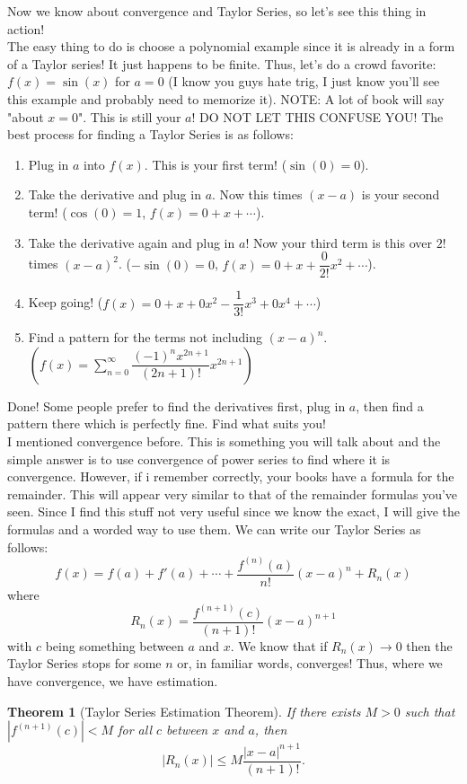 \documentclass[10pt]{article}
\theoremstyle{Theorem}
\newtheorem{theorem}{Theorem}[section]
\theoremstyle{definition}
\theoremstyle{remark}
\theoremstyle{custom}
\begin{document}
Now we know about convergence and Taylor Series, so let's see this thing in action!\\
The easy thing to do is choose a polynomial example since it is already in a form of a Taylor series! It just happens to be finite. Thus, let's do a crowd favorite: $f(x)=\sin(x)$ for $a=0$ (I know you guys hate trig, I just know you'll see this example and probably need to memorize it).
NOTE: A lot of book will say "about $x=0$". This is still your $a$! DO NOT LET THIS CONFUSE YOU! The best process for finding a Taylor Series is as follows:
\begin{enumerate}[1.]
\item Plug in $a$ into $f(x)$. This is your first term! ($\sin(0)=0$). 
\item Take the derivative and plug in $a$.  Now this times $(x-a)$ is your second term! ($\cos(0)=1$, $f(x)=0+x+ \cdots$).
\item Take the derivative again and plug in $a$! Now your third term is this over $2!$ times $(x-a)^2$. ($-\sin(0)=0$, $f(x)=0+x+\dfrac{0}{2!}x^2+\cdots$).
\item Keep going! ($f(x)=0+x+0x^2-\dfrac{1}{3!}x^3+0x^4+\cdots$)
\item Find a pattern for the terms not including $(x-a)^n$. $\left(f(x)=\sum_{n=0}^{\infty}\dfrac{(-1)^{n}x^{2n+1}}{(2n+1)!}x^{2n+1}\right)$
\end{enumerate}
Done! Some people prefer to find the derivatives first, plug in $a$, then find a pattern there which is perfectly fine. Find what suits you!\\ 
I mentioned convergence before. This is something you will talk about and the simple answer is to use convergence of power series to find where it is convergence. However, if i remember correctly, your books have a formula for the remainder. This will appear very similar to that of the remainder formulas you've seen. Since I find this stuff not very useful since we know the exact, I will give the formulas and a worded way to use them.
\newpage
We can write our Taylor Series as follows:
\[
f(x)=f(a)+f'(a)+\cdots +\dfrac{f^{(n)}(a)}{n!}(x-a)^n+R_n(x)
\]
where
\[
R_n(x)=\dfrac{f^{(n+1)}(c)}{(n+1)!}(x-a)^{n+1}
\] 
with $c$ being something between $a$ and $x$. We know that if $R_n(x) \rightarrow 0$ then the Taylor Series stops for some $n$ or, in familiar words, converges! Thus, where we have convergence, we have estimation.
\begin{theorem}[Taylor Series Estimation Theorem]
If there exists $M>0$ such that $|f^{(n+1)}(c)|<M$ for all $c$ between $x$ and $a$, then 
\[
|R_n(x)|\leq M\dfrac{|x-a|^{n+1}}{(n+1)!}.
\]
\end{theorem}
\end{document}
